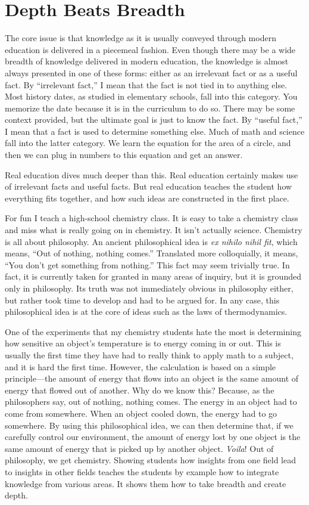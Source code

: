 \section{Depth Beats Breadth}

The core issue is that knowledge as it is usually conveyed through
modern education is delivered in a piecemeal fashion. Even though there
may be a wide breadth of knowledge delivered in modern education, the
knowledge is almost always presented in one of these forms: either as
an irrelevant fact or as a useful fact. By “irrelevant fact,” I mean
that the fact is not tied in to anything else. Most history dates, as
studied in elementary schools, fall into this category. You memorize
the date because it is in the curriculum to do so. There may be some
context provided, but the ultimate goal is just to know the fact. By
“useful fact,” I mean that a fact is used to determine something else.
Much of math and science fall into
the latter category.
We learn the equation for the area of a circle, and then we can plug in
numbers to this equation and get an answer.

Real education dives
much deeper than this. Real education certainly makes use of irrelevant
facts and useful facts. But real education teaches the student how
everything fits
together, and how such ideas are constructed in the first place.

For fun I teach a high-school chemistry class. It is easy to take a
chemistry class and miss what is really going on in chemistry. It isn’t
actually science. Chemistry is all about philosophy. An ancient
philosophical idea is \textit{ex nihilo nihil fit}, which means, “Out
of nothing, nothing comes.” Translated more colloquially, it means,
“You don’t get something from nothing.”  This fact may seem trivially
true. In fact, it is currently taken for granted in many areas of
inquiry, but it is
grounded only in philosophy. Its truth was not immediately obvious in
philosophy either, but rather took time to develop and had to be argued
for. In any case, this philosophical idea is at the core of ideas such
as the laws of thermodynamics. 

One of the experiments that my chemistry students hate the most is
determining how sensitive an object's temperature is
to energy coming in or out. This is usually the first time they have
had to really think to apply math to a subject, and it is hard the
first time. However, the calculation is based on a simple principle—the
amount of energy that flows into an object is the same amount of energy
that flowed out of another. Why do we know this? Because, as the
philosophers say, out of nothing, nothing comes. The energy in an
object had to come from somewhere. When an object cooled down, the
energy had to go somewhere. By using this philosophical idea, we can
then determine that, if we carefully control our environment, the
amount of energy lost by one object is the same amount of energy that
is picked up by another object. \textit{Voila}! Out of philosophy, we
get chemistry. Showing students how insights from one field lead to
insights in other fields teaches the students by example how to
integrate knowledge from various areas. It shows them how to take
breadth and create depth.

